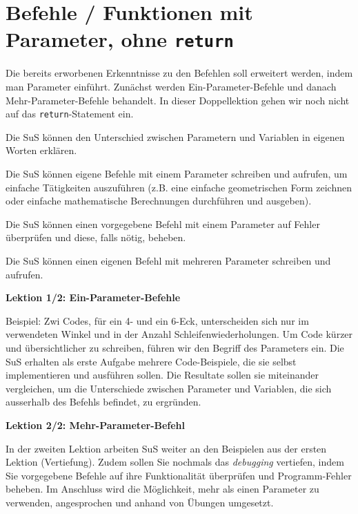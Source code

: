 \section{Befehle / Funktionen mit Parameter, ohne \texorpdfstring{\lstinline|return|}{return}}
\begin{myExBox}
	Die bereits erworbenen Erkenntnisse zu den Befehlen soll erweitert werden, indem man Parameter einführt. Zunächst werden Ein-Parameter-Befehle und danach Mehr-Parameter-Befehle behandelt. In dieser Doppellektion gehen wir noch nicht auf das \lstinline|return|-Statement ein.


	\begin{todolist}
		\item Die SuS können den Unterschied zwischen Parametern und Variablen in eigenen Worten erklären.
		\item Die SuS können eigene Befehle mit einem Parameter schreiben und aufrufen, um einfache Tätigkeiten auszuführen (z.B. eine einfache geometrischen Form zeichnen oder einfache mathematische Berechnungen durchführen und ausgeben).
		\item Die SuS können einen vorgegebene Befehl mit einem Parameter auf Fehler überprüfen und diese, falls nötig, beheben.
		\item Die SuS können einen eigenen Befehl mit mehreren Parameter schreiben und aufrufen.
	\end{todolist}

	\textbf{Lektion 1/2: Ein-Parameter-Befehle}

	Beispiel: Zwi Codes, für ein 4- und ein 6-Eck, unterscheiden sich nur im verwendeten Winkel und in der Anzahl Schleifenwiederholungen. Um Code kürzer und übersichtlicher zu schreiben, führen wir den Begriff des Parameters ein. Die SuS erhalten als erste Aufgabe mehrere Code-Beispiele, die sie selbst implementieren und ausführen sollen. Die Resultate sollen sie miteinander vergleichen, um die Unterschiede zwischen Parameter und Variablen, die sich ausserhalb des Befehls befindet, zu ergründen.

	\textbf{Lektion 2/2: Mehr-Parameter-Befehl}

	In der zweiten Lektion arbeiten SuS weiter an den Beispielen aus der ersten Lektion (Vertiefung). Zudem sollen Sie nochmals das \textit{debugging} vertiefen, indem Sie vorgegebene Befehle auf ihre Funktionalität überprüfen und Programm-Fehler beheben. Im Anschluss wird die Möglichkeit, mehr als einen Parameter zu verwenden, angesprochen und anhand von Übungen umgesetzt.


\end{myExBox}
